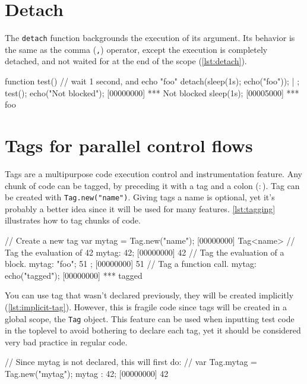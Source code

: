 \documentclass[openright,twoside,12pt]{report}
\begin{document}
\section{Detach}

The \texttt{detach} function backgrounds the execution of its
argument. Its behavior is the same as the comma (\texttt{,}) operator,
except the execution is completely detached, and not waited for at the
end of the scope (\autoref{lst:detach}).

\begin{urbiscript}[caption=Detach, label=lst:detach]
function test()
{
  // wait 1 second, and echo "foo"
  detach({sleep(1s); echo("foo")});
} | {};
test();
echo("Not blocked");
[00000000] *** Not blocked
sleep(1s);
[00005000] *** foo
\end{urbiscript}

\section{Tags for parallel control flows}

Tags are a multipurpose code execution control and instrumentation
feature. Any chunk of code can be tagged, by preceding it with a tag
and a colon (\texttt{$:$}). Tag can be created with
\lstinline|Tag.new("name")|. Giving tags a name is optional, yet it's
probably a better idea since it will be used for many
features. \autoref{lst:tagging} illustrates how to tag chunks of code.

\begin{urbiscript}[caption=Tagging a block of code, label=lst:tagging]
// Create a new tag
var mytag = Tag.new("name");
[00000000] Tag<name>
// Tag the evaluation of 42
mytag: 42;
[00000000] 42
// Tag the evaluation of a block.
mytag: { "foo"; 51 };
[00000000] 51
// Tag a function call.
mytag: echo("tagged");
[00000000] *** tagged
\end{urbiscript}

You can use tag that wasn't declared previously, they will be created
implicitly (\autoref{lst:implicit-tag}). However, this is fragile code since
tags will be created in a global scope, the \texttt{Tag} object. This
feature can be used when inputting test code in the toplevel to avoid
bothering to declare each tag, yet it should be considered very bad
practice in regular code.

\begin{urbiscript}[caption=Tag created implicitly,
label=lst:implicit-tag]
// Since mytag is not declared, this will first do:
// var Tag.mytag = Tag.new("mytag");
mytag : 42;
[00000000] 42
\end{urbiscript}
\end{document}
